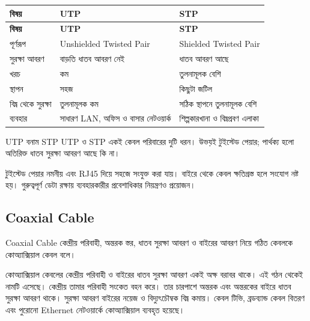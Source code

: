 \begingroup
\begin{longtable}{|p{}|p{}|p{}|}
\hline
\textbf{বিষয়} & \textbf{UTP} & \textbf{STP} \\
\hline
\endfirsthead
\hline
\textbf{বিষয়} & \textbf{UTP} & \textbf{STP} \\
\hline
\endhead

পূর্ণরূপ & Unshielded Twisted Pair & Shielded Twisted Pair \\
\hline
সুরক্ষা আবরণ & বাড়তি ধাতব আবরণ নেই & ধাতব আবরণ আছে \\
\hline
খরচ & কম & তুলনামূলক বেশি \\
\hline
স্থাপন & সহজ & কিছুটা জটিল \\
\hline
বিঘ্ন থেকে সুরক্ষা & তুলনামূলক কম & সঠিক স্থাপনে তুলনামূলক বেশি \\
\hline
ব্যবহার & সাধারণ LAN, অফিস ও বাসার নেটওয়ার্ক & শিল্পকারখানা ও বিঘ্নপ্রবণ এলাকা \\
\hline
\end{longtable}
\endgroup

\begin{mistakebox}{UTP বনাম STP}
UTP ও STP একই কেবল পরিবারের দুটি ধরন। উভয়ই টুইস্টেড পেয়ার; পার্থক্য হলো অতিরিক্ত ধাতব সুরক্ষা আবরণ আছে কি না।
\end{mistakebox}

টুইস্টেড পেয়ার নমনীয় এবং RJ45 দিয়ে সহজে সংযুক্ত করা যায়। বাইরে থেকে কেবল ক্ষতিগ্রস্ত হলে সংযোগ নষ্ট হয়। গুরুত্বপূর্ণ ডেটা রক্ষায় ব্যবহারকারীর প্রবেশাধিকার নিয়ন্ত্রণও প্রয়োজন।

\subsection{Coaxial Cable}

\begin{definitionbox}{Coaxial Cable}
কেন্দ্রীয় পরিবাহী, অন্তরক স্তর, ধাতব সুরক্ষা আবরণ ও বাইরের আবরণ নিয়ে গঠিত কেবলকে কোঅ্যাক্সিয়াল কেবল বলে।
\end{definitionbox}

কোঅ্যাক্সিয়াল কেবলের কেন্দ্রীয় পরিবাহী ও বাইরের ধাতব সুরক্ষা আবরণ একই অক্ষ বরাবর থাকে। এই গঠন থেকেই নামটি এসেছে। কেন্দ্রীয় তামার পরিবাহী সংকেত বহন করে। তার চারপাশে অন্তরক এবং অন্তরকের বাইরে ধাতব সুরক্ষা আবরণ থাকে। সুরক্ষা আবরণ বাইরের নয়েজ ও বিদ্যুৎচৌম্বক বিঘ্ন কমায়। কেবল টিভি, ব্রডব্যান্ড কেবল বিতরণ এবং পুরোনো Ethernet নেটওয়ার্কে কোঅ্যাক্সিয়াল ব্যবহৃত হয়েছে।


